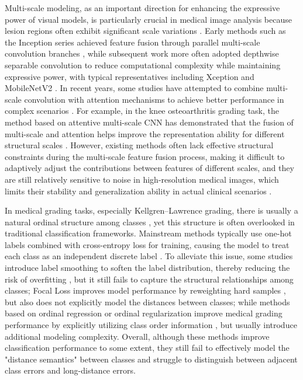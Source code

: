 \documentclass[runningheads]{llncs}
\begin{document}
Multi-scale modeling, as an important direction for enhancing the expressive power of visual models, is particularly crucial in medical image analysis because lesion regions often exhibit significant scale variations \cite{1}. Early methods such as the Inception series achieved feature fusion through parallel multi-scale convolution branches \cite{13}, while subsequent work more often adopted depthwise separable convolution to reduce computational complexity while maintaining expressive power, with typical representatives including Xception and MobileNetV2 \cite{14,15}. In recent years, some studies have attempted to combine multi-scale convolution with attention mechanisms to achieve better performance in complex scenarios \cite{7,8,20,22}. For example, in the knee osteoarthritis grading task, the method based on attentive multi-scale CNN has demonstrated that the fusion of multi-scale and attention helps improve the representation ability for different structural scales \cite{8}. However, existing methods often lack effective structural constraints during the multi-scale feature fusion process, making it difficult to adaptively adjust the contributions between features of different scales, and they are still relatively sensitive to noise in high-resolution medical images, which limits their stability and generalization ability in actual clinical scenarios \cite{8,20,23}.


In medical grading tasks, especially Kellgren–Lawrence grading, there is usually a natural ordinal structure among classes \cite{2,3,10,18,19,20,21,22}, yet this structure is often overlooked in traditional classification frameworks. Mainstream methods typically use one-hot labels combined with cross-entropy loss for training, causing the model to treat each class as an independent discrete label \cite{9,10}. To alleviate this issue, some studies introduce label smoothing to soften the label distribution, thereby reducing the risk of overfitting \cite{11}, but it still fails to capture the structural relationships among classes; Focal Loss improves model performance by reweighting hard samples \cite{17}, but also does not explicitly model the distances between classes; while methods based on ordinal regression or ordinal regularization improve medical grading performance by explicitly utilizing class order information \cite{3,9,10}, but usually introduce additional modeling complexity. Overall, although these methods improve classification performance to some extent, they still fail to effectively model the "distance semantics" between classes and struggle to distinguish between adjacent class errors and long-distance errors.
\end{document}

